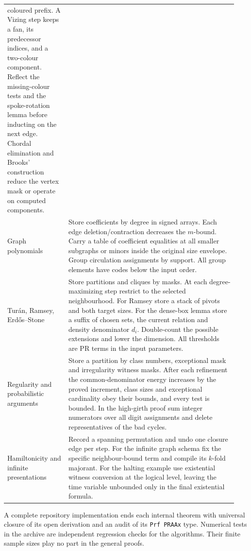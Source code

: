\begin{longtable}{@{} >{\raggedright\arraybackslash}p{0.25\linewidth}@{\hspace{0.035\linewidth}}p{0.69\linewidth}@{}}
coloured prefix. A Vizing step keeps a fan, its predecessor indices, and a
two-colour component. Reflect the missing-colour tests and the spoke-rotation
lemma before inducting on the next edge. Chordal elimination and Brooks'
construction reduce the vertex mask or operate on computed components.\\[4pt]
Graph polynomials & Store coefficients by degree in signed arrays. Each
edge deletion/contraction decreases the $m$-bound. Carry a table of
coefficient equalities at all smaller subgraphs or minors inside the
original size envelope. Group circulation assignments by support. All group
elements have codes below the input order.\\[4pt]
Tur\'an, Ramsey, Erd\H{o}s--Stone & Store partitions and cliques by masks.
At each degree-maximizing step restrict to the selected neighbourhood.
For Ramsey store a stack of pivots and both target sizes. For the
dense-box lemma store a suffix of chosen sets, the current relation
and density denominator $d_i$. Double-count the possible extensions
and lower the dimension. All thresholds are PR terms in the input parameters.\\[4pt]
Regularity and probabilistic arguments & Store a partition by class numbers,
exceptional mask and irregularity witness masks. After each refinement the
common-denominator energy increases by the proved increment, class sizes
and exceptional cardinality obey their bounds, and every test is bounded.
In the high-girth proof sum integer numerators over all digit assignments
and delete representatives of the bad cycles.\\[4pt]
Hamiltonicity and infinite presentations & Record a spanning permutation and
undo one closure edge per step. For the infinite graph schema fix the specific
neighbour-bound term and compile its $k$-fold majorant. For the halting example
use existential witness conversion at the logical level, leaving the time
variable unbounded only in the final existential formula.\\
\bottomrule
\end{longtable}
A complete repository implementation ends each internal theorem with universal
closure of its open derivation and an audit of its \texttt{Prf PRAAx} type.
Numerical tests in the archive are independent regression checks for the
algorithms. Their finite sample sizes play no part in the general proofs.

